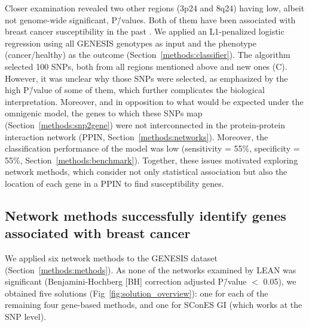 \documentclass[10pt,letterpaper]{article}
\begin{document}
Closer examination revealed two other regions (3p24 and 8q24) having low, albeit not genome-wide significant, P\=/values. Both of them have been associated with breast cancer susceptibility in the past \cite{brisbin_meta-analysis_2011,search_newly_2009}. We applied an L1-penalized logistic regression using all GENESIS genotypes as input and the phenotype (cancer/healthy) as the outcome (Section~\ref{methods:classifier}). The algorithm selected 100 SNPs, both from all regions mentioned above and new ones (C). However, it was unclear why those SNPs were selected, as emphasized by the high P\=/value of some of them, which further complicates the biological interpretation. Moreover, and in opposition to what would be expected under the omnigenic model, the genes to which these SNPs map (Section~\ref{methods:snp2gene}) were not interconnected in the protein-protein interaction network (PPIN, Section~\ref{methods:networks}). Moreover, the classification performance of the model was low (sensitivity = 55\%, specificity = 55\%, Section~\ref{methods:benchmark}). Together, these issues motivated exploring network methods, which consider not only statistical association but also the location of each gene in a PPIN to find susceptibility genes.

\subsection{Network methods successfully identify genes associated with breast cancer}
\label{results:separate_networks}

We applied six network methods to the GENESIS dataset (Section~\ref{methods:methods}). As none of the networks examined by LEAN was significant (Benjamini-Hochberg [BH] correction adjusted P\=/value $<$ 0.05), we obtained five solutions (Fig~\ref{fig:solution_overview}): one for each of the remaining four gene-based methods, and one for SConES GI (which works at the SNP level).
\end{document}
